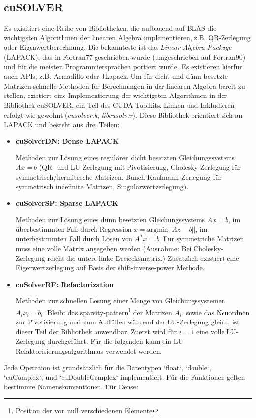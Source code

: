 		\subsection{cuSOLVER}
		Es exisitiert eine Reihe von Bibliotheken, die aufbauend auf BLAS die wichtigsten Algorithmen der linearen Algebra implementieren, z.B. QR-Zerlegung oder Eigenwertberechnung. Die bekannteste ist das \textit{Linear Algebra Package} (LAPACK), das in Fortran77 geschrieben wurde (umgeschrieben auf Fortran90) und für die meisten Programmiersprachen portiert wurde. Es existieren hierfür auch \Glspl{API}, z.B. Armadillo oder JLapack.
		Um für dicht und dünn besetzte Matrizen schnelle Methoden für Berechnungen in der linearen Algebra bereit zu stellen, existiert eine Implementierung der wichtigsten Algorithmen in der Bibliothek cuSOLVER, ein Teil des CUDA Toolkits. Linken und Inkludieren erfolgt wie gewohnt (\textit{cusolver.h}, \textit{libcusolver}). Diese Bibliothek orientiert sich an LAPACK und besteht aus drei Teilen:
		\begin{itemize}
		\item \textbf{cuSolverDN: Dense LAPACK} 
		
		Methoden zur Lösung eines regulären dicht besetzten Gleichungssystems $Ax = b$ (QR- und LU-Zerlegung mit Pivotisierung, Cholesky Zerlegung für symmetrisch/hermitesche Matrizen, Bunch-Kaufmann-Zerlegung für symmetrisch indefinite Matrizen, Singulärwertzerlegung).
		
		\item \textbf{cuSolverSP: Sparse LAPACK}
		
		Methoden zur Lösung eines dünn besetzten Gleichungssystems $Ax = b$, im überbestimmten Fall durch Regression $x = \text{argmin}||Az-b||$, im unterbestimmten Fall durch Lösen von $A^Tx=b$. Für symmetriche Matrizen muss eine volle Matrix angegeben werden (Ausnahme: Bei Cholesky-Zerlegung reicht die untere linke Dreiecksmatrix.) Zusätzlich existiert eine Eigenwertzerlegung auf Basis der shift-inverse-power Methode. 
		
		\item \textbf{cuSolverRF: Refactorization}
		
		Methoden zur schnellen Lösung einer Menge von Gleichungssystemen $A_i x_i = b_i$. Bleibt das sparsity-pattern\footnote{Position der von null verschiedenen Elemente} der Matrizen $A_i$, sowie das Neuordnen zur Pivotisierung und zum Auffüllen während der LU-Zerlegung gleich, ist dieser Teil der Bibliothek anwendbar. Zuerst wird für $i=1$ eine volle LU-Zerlegung durchgeführt. Für die folgenden kann ein LU-Refaktorisierungsalgorithmus verwendet werden.	
		\end{itemize}
		Jede Operation ist grundsätzlich für die Datentypen \li`float`, \li`double`, \li`cuComplex`, und \li`cuDoubleComplex` implementiert. Für die Funktionen gelten bestimmte Namenskonventionen. Für Dense:
		
